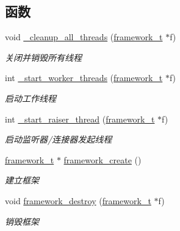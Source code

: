 \subsection*{函数}
\begin{DoxyCompactItemize}
\item 
void \hyperlink{a00052_a078a0669d562c7b17cf3116ab9ea9d72_a078a0669d562c7b17cf3116ab9ea9d72}{\+\_\+cleanup\+\_\+all\+\_\+threads} (\hyperlink{a00051_a6149d769f6f07ed14a40a271c95d8463_a6149d769f6f07ed14a40a271c95d8463}{framework\+\_\+t} $\ast$f)
\begin{DoxyCompactList}\small\item\em 关闭并销毁所有线程 \end{DoxyCompactList}\item 
int \hyperlink{a00052_a4d6a26c93873119bb08c47963705593b_a4d6a26c93873119bb08c47963705593b}{\+\_\+start\+\_\+worker\+\_\+threads} (\hyperlink{a00051_a6149d769f6f07ed14a40a271c95d8463_a6149d769f6f07ed14a40a271c95d8463}{framework\+\_\+t} $\ast$f)
\begin{DoxyCompactList}\small\item\em 启动工作线程 \end{DoxyCompactList}\item 
int \hyperlink{a00052_af20c94f693291564019fdc588d59d69c_af20c94f693291564019fdc588d59d69c}{\+\_\+start\+\_\+raiser\+\_\+thread} (\hyperlink{a00051_a6149d769f6f07ed14a40a271c95d8463_a6149d769f6f07ed14a40a271c95d8463}{framework\+\_\+t} $\ast$f)
\begin{DoxyCompactList}\small\item\em 启动监听器/连接器发起线程 \end{DoxyCompactList}\item 
\hyperlink{a00051_a6149d769f6f07ed14a40a271c95d8463_a6149d769f6f07ed14a40a271c95d8463}{framework\+\_\+t} $\ast$ \hyperlink{a00103_ga90b29a0c500209cb9b37437a32188a40_ga90b29a0c500209cb9b37437a32188a40}{framework\+\_\+create} ()
\begin{DoxyCompactList}\small\item\em 建立框架 \end{DoxyCompactList}\item 
void \hyperlink{a00103_gad1b6cb17014bfc515f8861bad3198e22_gad1b6cb17014bfc515f8861bad3198e22}{framework\+\_\+destroy} (\hyperlink{a00051_a6149d769f6f07ed14a40a271c95d8463_a6149d769f6f07ed14a40a271c95d8463}{framework\+\_\+t} $\ast$f)
\begin{DoxyCompactList}\small\item\em 销毁框架 \end{DoxyCompactList}\item 

\end{DoxyCompactItemize}
